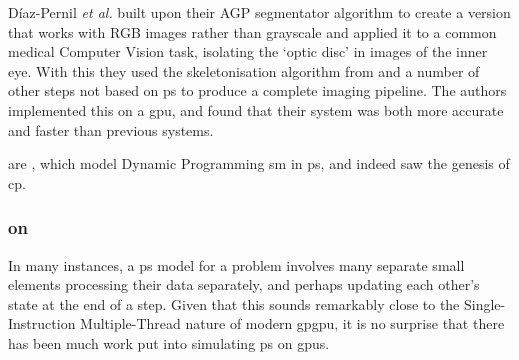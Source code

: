 Díaz-Pernil \textit{et al.} \cite{Diaz-Pernil2016} built upon their AGP segmentator algorithm to create a version that works with RGB images rather than grayscale and applied it to a common medical Computer Vision task, isolating the `optic disc' in images of the inner eye.  With this they used the skeletonisation algorithm from \cite{Diaz-Pernil2013a} and a number of other steps not based on \gls{ps} to produce a complete imaging pipeline.  The authors implemented this on a \gls{gpu}, and found that their system was both more accurate and faster than previous systems.


 are \cite{GimelFarb2013a,Gimelfarb2011,Nicolescu2014b}, which model Dynamic Programming \gls{sm} in \gls{ps}, and indeed saw the genesis of \gls{cp}.

\subsubsection{ on }
In many instances, a \gls{ps} model for a problem involves many separate small elements processing their data separately, and perhaps updating each other's state at the end of a step.  Given that this sounds remarkably close to the Single-Instruction Multiple-Thread \cite[Ch. 4.4.1]{Hennessy2012} nature of modern \gls{gpgpu}, it is no surprise that there has been much work put into simulating \gls{ps} on \glspl{gpu}.



